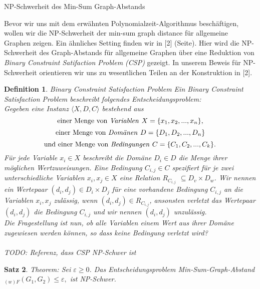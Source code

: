 \documentclass[a4paper, 12pt, twoside]{article}
\theoremstyle{Format1} %
\newtheorem{Def}{Definition}[section]       %
\newtheorem{Satz}[Def]{Satz}                %
\begin{document}
\newpage
NP-Schwerheit des Min-Sum Graph-Abstands

Bevor wir uns mit dem erwähnten Polynomialzeit-Algorithmus beschäftigen, wollen wir die NP-Schwerheit der min-sum graph distance für allgemeine Graphen zeigen.
Ein ähnliches Setting finden wir in [2] (Seite). Hier wird die NP-Schwerheit des Graph-Abstands für allgemeine Graphen über eine Reduktion von
\textit{Binary Constraint Satifaction Problem (CSP)} gezeigt. In unserem Beweis für NP-Schwerheit orientieren wir uns zu wesentlichen Teilen an der Konstruktion in [2].

\begin{Def}
	Binary Constraint Satisfaction Problem
	Ein \textit{Binary Constraint Satisfaction Problem} beschreibt folgendes Entscheidungsproblem:
	\\
	Gegeben eine Instanz $\langle X,D,C \rangle$ bestehend aus
	$$ \text{einer Menge von \textit{Variablen }}X = \{x_1, x_2, ..., x_n\},$$
	$$ \text{einer Menge von \textit{Domänen }}D = \{D_1, D_2, ..., D_n\} $$
	$$ \text{und einer Menge von \textit{Bedingungen }}C = \{C_1, C_2, ..., C_k\}. $$
	Für jede Variable $ x_i \in X$ beschreibt die Domäne $ D_i \in D$ die Menge ihrer möglichen Wertzuweisungen.
	Eine Bedingung $C_{i,j} \in C$ spezifiert für je zwei unterschiedliche Variablen $x_i, x_j \in X$ eine Relation $R_{C_{i,j}}$ $\subseteq D_v \times D_w$.
	Wir nennen ein Wertepaar $(d_i, d_j) \in D_i \times D_j$ für eine vorhandene Bedingung $C_{i,j}$ an die Variablen $x_i,x_j$ \textit{zulässig}, wenn $(d_i,d_j) \in R_{C_{i,j}}$,
	ansonsten \textit{verletzt} das Wertepaar $(d_i, d_j)$ die Bedingung $C_{i,j}$ und wir nennen $(d_i,d_j)$ \textit{unzulässig}.
	\\
	Die Fragestellung ist nun, ob alle Variablen einem Wert aus ihrer Domäne zugewiesen werden können, so dass keine Bedingung verletzt wird?
	\\
	\\
	TODO: Referenz, dass CSP NP-Schwer ist

\end{Def}

\begin{Satz}
	Theorem: Sei $\varepsilon \geq 0$. Das Entscheidungsproblem \textit{Min-Sum-Graph-Abstand}$_{(w)F}(G_1, G_2)  \leq  \varepsilon, $ ist NP-Schwer.
\end{Satz}
\end{document}
